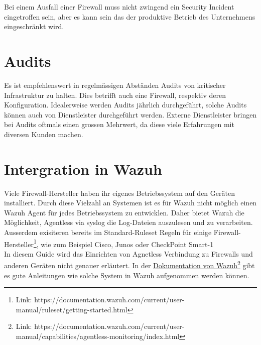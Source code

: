 Bei einem Ausfall einer Firewall muss nicht zwingend ein Security Incident eingetroffen sein, aber es kann sein das der produktive Betrieb des Unternehmens eingeschränkt wird.


\section{Audits}
Es ist empfehlenswert in regelmässigen Abständen Audits von kritischer Infrastruktur zu halten.
Dies betrifft auch eine Firewall, respektiv deren Konfiguration.
Idealerweise werden Audits jährlich durchgeführt, solche Audits können auch von Dienstleister durchgeführt werden.
Externe Dienstleister bringen bei Audits oftmals einen grossen Mehrwert, da diese viele Erfahrungen mit diversen Kunden machen.

\section{Intergration in Wazuh}
Viele Firewall-Hersteller haben ihr eigenes Betriebssystem auf den Geräten installiert.
Durch diese Vielzahl an Systemen ist es für Wazuh nicht möglich einen Wazuh Agent für jedes Betriebssystem zu entwicklen.
Daher bietet Wazuh die Möglichkeit, Agentless via syslog die Log-Dateien auszulesen und zu verarbeiten.\\

Ausserdem exisiteren bereits im Standard-Ruleset Regeln für einige Firewall-Hersteller\footnote{Link: https://documentation.wazuh.com/current/user-manual/ruleset/getting-started.html}, wie zum Beispiel Cisco, Junos oder CheckPoint Smart-1\\

In diesem Guide wird das Einrichten von Agnetless Verbindung zu Firewalls und anderen Geräten nicht genauer erläutert.
In der \href{https://documentation.wazuh.com/current/user-manual/capabilities/agentless-monitoring/index.html}{Dokumentation von Wazuh}\footnote{Link: https://documentation.wazuh.com/current/user-manual/capabilities/agentless-monitoring/index.html} gibt es gute Anleitungen wie solche System in Wazuh aufgenommen werden können.